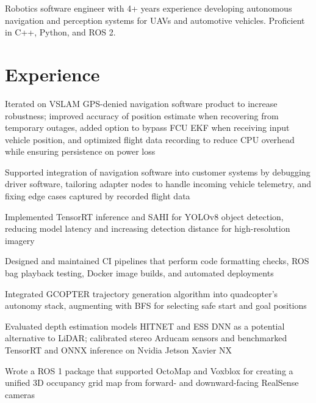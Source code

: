 \documentclass{resume}
\begin{document}


\begin{personalstatement}
  Robotics software engineer with 4+ years experience developing autonomous navigation
  and perception systems for UAVs and automotive vehicles. Proficient in C++, Python, and ROS 2.
\end{personalstatement}

\section{Experience}

\begin{details}
  \item Iterated on VSLAM GPS-denied navigation software product to increase robustness; improved accuracy
  of position estimate when recovering from temporary outages, added option to bypass FCU EKF when
  receiving input vehicle position, and optimized flight data recording to reduce CPU overhead while
  ensuring persistence on power loss
  \item Supported integration of navigation software into customer systems by debugging driver software,
  tailoring adapter nodes to handle incoming vehicle telemetry, and fixing edge cases captured by
  recorded flight data
  \item Implemented TensorRT inference and SAHI for YOLOv8 object detection, reducing model latency and
  increasing detection distance for high-resolution imagery
  \item Designed and maintained CI pipelines that perform code formatting checks, ROS bag playback testing,
  Docker image builds, and automated deployments
\end{details}

\begin{details}
  \item Integrated GCOPTER trajectory generation algorithm into quadcopter’s autonomy stack, augmenting
  with BFS for selecting safe start and goal positions
  \item Evaluated depth estimation models HITNET and ESS DNN as a potential alternative to LiDAR;
  calibrated stereo Arducam sensors and benchmarked TensorRT and ONNX inference on Nvidia Jetson
  Xavier NX
  \item Wrote a ROS 1 package that supported OctoMap and Voxblox for creating a unified 3D occupancy grid
  map from forward- and downward-facing RealSense cameras
\end{details}
\end{document}
